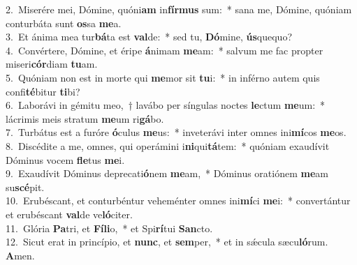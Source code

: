 {2.~}Miserére mei, Dómine, quóni\textbf{am} in\textbf{fír}\textbf{mus} sum:~* sana me, Dómine, quóniam conturbáta sunt \textbf{os}sa \textbf{me}a.\\
{3.~}Et ánima mea tur\textbf{bá}ta est \textbf{val}de:~* sed tu, \textbf{Dó}mine, \textbf{ús}quequo?\\
{4.~}Convértere, Dómine, et éripe \textbf{á}nimam \textbf{me}am:~* salvum me fac propter miseri\textbf{cór}diam \textbf{tu}am.\\
{5.~}Quóniam non est in morte qui \textbf{me}mor sit \textbf{tu}i:~* in inférno autem quis confi\textbf{té}bitur \textbf{ti}bi?\\
{6.~}Laborávi in gémitu meo,~† lavábo per síngulas noctes \textbf{le}ctum \textbf{me}um:~* lácrimis meis stratum \textbf{me}um ri\textbf{gá}bo.\\
{7.~}Turbátus est a furóre \textbf{ó}culus \textbf{me}us:~* inveterávi inter omnes ini\textbf{mí}cos \textbf{me}os.\\
{8.~}Discédite a me, omnes, qui operámini i\textbf{ni}qui\textbf{tá}tem:~* quóniam exaudívit Dóminus vocem \textbf{fle}tus \textbf{me}i.\\
{9.~}Exaudívit Dóminus deprecati\textbf{ó}nem \textbf{me}am,~* Dóminus oratiónem \textbf{me}am su\textbf{scé}pit.\\
{10.~}Erubéscant, et conturbéntur veheménter omnes ini\textbf{mí}ci \textbf{me}i:~* convertántur et erubéscant \textbf{val}de ve\textbf{ló}citer.\\
{11.~}Glória \textbf{Pa}tri, et \textbf{Fí}\textbf{li}o,~* et Spi\textbf{rí}tui \textbf{San}cto.\\
{12.~}Sicut erat in princípio, et \textbf{nunc}, et \textbf{sem}per,~* et in sǽcula sæcu\textbf{ló}rum. \textbf{A}men.\\
